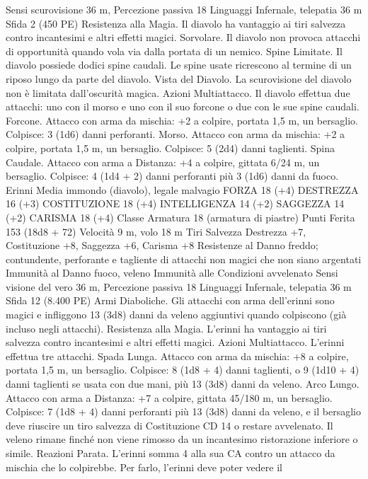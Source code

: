 \begin{multicols}{2}
Sensi scurovisione 36 m, Percezione passiva 18
Linguaggi Infernale, telepatia 36 m
Sfida 2 (450 PE)
Resistenza alla Magia. Il diavolo ha vantaggio ai tiri salvezza
contro incantesimi e altri effetti magici.
Sorvolare. Il diavolo non provoca attacchi di opportunità quando
vola via dalla portata di un nemico.
Spine Limitate. Il diavolo possiede dodici spine caudali. Le
spine usate ricrescono al termine di un riposo lungo da parte del
diavolo.
Vista del Diavolo. La scurovisione del diavolo non è limitata
dall’oscurità magica.
Azioni
Multiattacco. Il diavolo effettua due attacchi: uno con il morso e
uno con il suo forcone o due con le sue spine caudali.
Forcone. Attacco con arma da mischia: +2 a colpire, portata 1,5
m, un bersaglio.
Colpisce: 3 (1d6) danni perforanti.
Morso. Attacco con arma da mischia: +2 a colpire, portata 1,5
m, un bersaglio.
Colpisce: 5 (2d4) danni taglienti.
Spina Caudale. Attacco con arma a Distanza: +4 a colpire,
gittata 6/24 m, un bersaglio.
Colpisce: 4 (1d4 + 2) danni perforanti più 3 (1d6) danni da
fuoco.
Erinni
Media immondo (diavolo), legale malvagio
FORZA 18 (+4)
DESTREZZA 16 (+3)
COSTITUZIONE 18 (+4)
INTELLIGENZA 14 (+2)
SAGGEZZA 14 (+2)
CARISMA 18 (+4)
Classe Armatura 18 (armatura di piastre)
Punti Ferita 153 (18d8 + 72)
Velocità 9 m, volo 18 m
Tiri Salvezza Destrezza +7, Costituzione +8, Saggezza +6,
Carisma +8
Resistenze al Danno freddo; contundente, perforante e tagliente
di attacchi non magici che non siano argentati
Immunità al Danno fuoco, veleno
Immunità alle Condizioni avvelenato
Sensi visione del vero 36 m, Percezione passiva 18
Linguaggi Infernale, telepatia 36 m
Sfida 12 (8.400 PE)
Armi Diaboliche. Gli attacchi con arma dell’erinni sono magici e
infliggono 13 (3d8) danni da veleno aggiuntivi quando
colpiscono (già incluso negli attacchi).
Resistenza alla Magia. L’erinni ha vantaggio ai tiri salvezza
contro incantesimi e altri effetti magici.
Azioni
Multiattacco. L’erinni effettua tre attacchi.
Spada Lunga. Attacco con arma da mischia: +8 a colpire,
portata 1,5 m, un bersaglio.
Colpisce: 8 (1d8 + 4) danni taglienti, o 9 (1d10 + 4) danni
taglienti se usata con due mani, più 13 (3d8) danni da veleno.
Arco Lungo. Attacco con arma a Distanza: +7 a colpire, gittata
45/180 m, un bersaglio.
Colpisce: 7 (1d8 + 4) danni perforanti più 13 (3d8) danni da
veleno, e il bersaglio deve riuscire un tiro salvezza di
Costituzione CD 14 o restare avvelenato. Il veleno rimane finché
non viene rimosso da un incantesimo ristorazione inferiore o
simile.
Reazioni
Parata. L’erinni somma 4 alla sua CA contro un attacco da
mischia che lo colpirebbe. Per farlo, l’erinni deve poter vedere il

\end{multicols}
